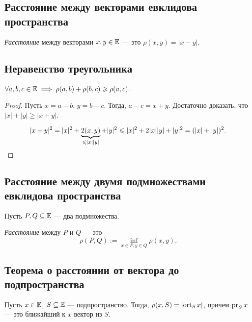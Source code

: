 \subsection{Расстояние между векторами евклидова пространства}

\begin{definition}
    \textit{Расстояние} между векторами $x, y \in \EE$ --- это $\rho(x, y) = |x - y|$.
\end{definition}


\subsection{Неравенство треугольника}

\begin{proposal}
    $\forall a, b, c \in \EE \implies \rho(a, b) + \rho(b, c) \geq \rho(a, c)$.
\end{proposal}

\begin{proof}
    Пусть $x = a - b$, $y = b - c$. Тогда, $a - c = x + y$.
    Достаточно доказать, что $|x| + |y| \geq |x + y|$.

    \begin{equation*}
        |x + y|^2 = |x|^2 + \underbrace{2(x, y)}_{\leq |x||y|} + |y|^2 \leq |x|^2 + 2|x||y| + |y|^2 = (|x| + |y|)^2
    .\qedhere\end{equation*}
\end{proof}


\subsection{Расстояние между двумя подмножествами евклидова пространства}

Пусть $P, Q \subseteq \EE$ --- два подмножества.

\begin{definition}
    \textit{Расстояние} между $P$ и $Q$ --- это
    \begin{equation*}
        \rho(P, Q) := \inf_{x \in P, y \in Q} \rho(x, y)
    .\end{equation*}
\end{definition}


\subsection{Теорема о расстоянии от вектора до подпространства}

\begin{theorem}
    Пусть $x \in \EE$, $S \subseteq \EE$ --- подпространство. Тогда, $\rho(x, S) = \left|\ort_S x\right|$, причем $\pr_S x$ --- это ближайший к $x$ вектор из $S$.
\end{theorem}

